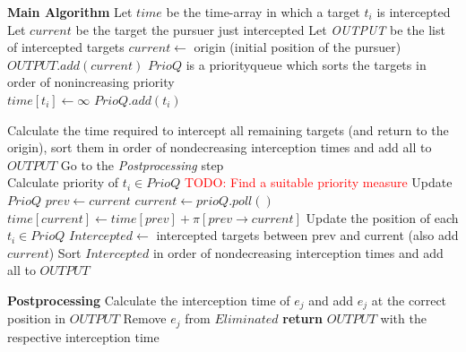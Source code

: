 \documentclass{scrartcl}
\begin{document}
\begin{minipage}{1\linewidth}
\begin{algorithm}[H]
\begin{algorithmic}

\State \textbf{Main Algorithm}
\State Let $time$ be the time-array in which a target $t_i$ is intercepted
\State Let $current$ be the target the pursuer just intercepted
\State Let \emph{OUTPUT} be the list of intercepted targets 
\State $current\leftarrow$ origin (initial position of the pursuer)
\State $OUTPUT.add(current)$ 
\State $PrioQ$ is a priorityqueue which sorts the targets in order of nonincreasing priority\\

\State $time[t_i]\leftarrow \infty$
\State $PrioQ.add(t_i)$
\EndFor

\State Calculate the time required to intercept all remaining targets (and return 
\State to the origin), sort them in order of nondecreasing interception times and 
\State add all to $OUTPUT$
\State Go to the \emph{Postprocessing} step
\EndIf \\

\State Calculate priority of $t_i\in PrioQ$ \textcolor{red}{TODO: Find a suitable priority measure}
\State Update $PrioQ$
\State $prev \leftarrow current$
\State $current \leftarrow prioQ.poll()$
\State $time[current] \leftarrow time[prev] + \pi[prev\rightarrow current]$
\State Update the position of each $t_i\in PrioQ$
\State $Intercepted \leftarrow$ intercepted targets between prev and current (also add $current$)
\State Sort $Intercepted$ in order of nondecreasing interception times and add all to $OUTPUT$
\EndWhile

\end{algorithmic}
\end{algorithm}
\end{minipage}

\pagebreak

\begin{minipage}{1\linewidth}
\begin{algorithm}[H]
\begin{algorithmic}

\State \textbf{Postprocessing}
\State Calculate the interception time of $e_j$ and add $e_j$ at the correct position in $OUTPUT$
\State Remove $e_j$ from $Eliminated$ 
\EndIf
\EndFor
\State \textbf{return} $OUTPUT$ with the respective interception time

\end{algorithmic}
\end{algorithm}
\end{minipage}

\end{document}
